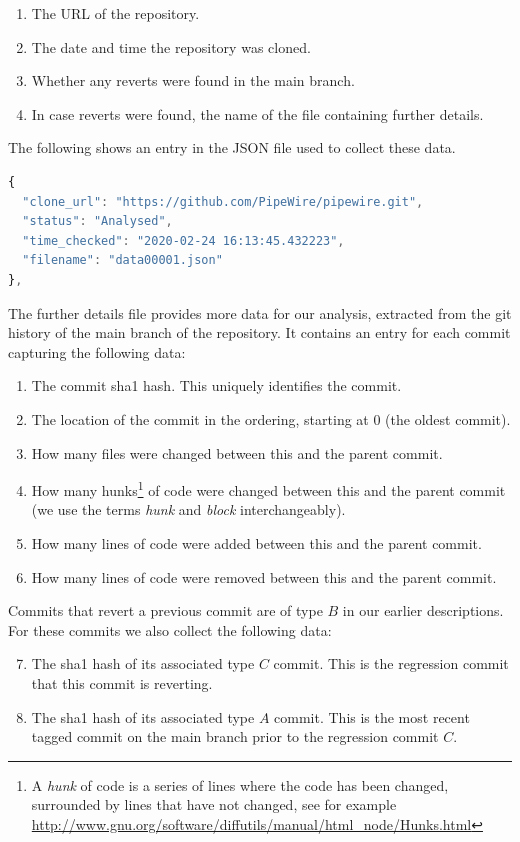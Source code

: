 \documentclass[pdflatex, sn-mathphys, referee]{sn-jnl}%
\theoremstyle{thmstyleone}%
\theoremstyle{thmstyletwo}%
\theoremstyle{thmstylethree}%
\theoremstyle{thmstyleone}
\begin{document}
\begin{enumerate}
\item The URL of the repository.
\item The date and time the repository was cloned.
\item Whether any reverts were found in the main branch.
\item In case reverts were found, the name of the file containing further details.
\end{enumerate}

The following shows an entry in the JSON file used to collect these data.

\begin{lstlisting}[language=JavaScript]
{
  "clone_url": "https://github.com/PipeWire/pipewire.git",
  "status": "Analysed",
  "time_checked": "2020-02-24 16:13:45.432223",
  "filename": "data00001.json"
},
\end{lstlisting}

The further details file provides more data for our analysis, extracted from the git history of the main branch of the repository. It contains an entry for each commit capturing the following data:

\begin{enumerate}
\item The commit sha1 hash. This uniquely identifies the commit.
\item The location of the commit in the ordering, starting at 0 (the oldest commit).
\item How many files were changed between this and the parent commit.
\item How many hunks\footnote{A {\it hunk\/} of code is a series of lines where the code has been changed, surrounded by lines that have not changed, see for example \url{http://www.gnu.org/software/diffutils/manual/html_node/Hunks.html}} of code were changed between this and the parent commit (we use the terms {\it hunk\/} and {\it block\/} interchangeably).
\item How many lines of code were added between this and the parent commit.
\item How many lines of code were removed between this and the parent commit.
\end{enumerate}

Commits that revert a previous commit are of type $B$ in our earlier descriptions. For these commits we also collect the following data:

\begin{enumerate}
\setcounter{enumi}{6}
\item The sha1 hash of its associated type $C$ commit. This is the regression commit that this commit is reverting.
\item The sha1 hash of its associated type $A$ commit. This is the most recent tagged commit on the main branch prior to the regression commit $C$. 
\end{enumerate}
\end{document}
